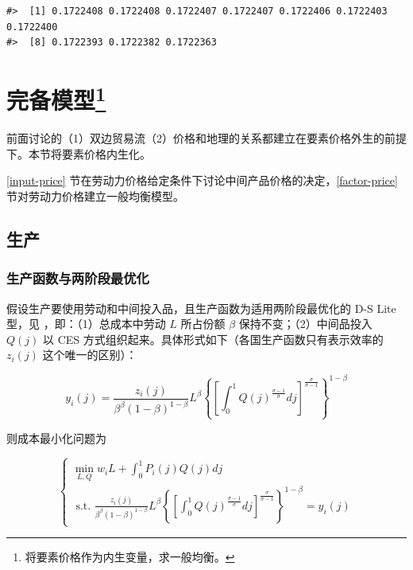 \documentclass[
]{article}
\begin{document}
\begin{verbatim}
#>  [1] 0.1722408 0.1722408 0.1722407 0.1722407 0.1722406 0.1722403 0.1722400
#>  [8] 0.1722393 0.1722382 0.1722363
\end{verbatim}

\hypertarget{ux5b8cux5907ux6a21ux578b14}{%
\section[完备模型]{\texorpdfstring{完备模型\footnote{将要素价格作为内生变量，求一般均衡。}}{完备模型}}\label{ux5b8cux5907ux6a21ux578b14}}

前面讨论的（1）双边贸易流（2）价格和地理的关系都建立在要素价格外生的前提下。本节将要素价格内生化。

\ref{input-price}
节在劳动力价格给定条件下讨论中间产品价格的决定，\ref{factor-price}
节对劳动力价格建立一般均衡模型。

\hypertarget{ux751fux4ea7}{%
\subsection{生产}\label{ux751fux4ea7}}

\hypertarget{ux751fux4ea7ux51fdux6570ux4e0eux4e24ux9636ux6bb5ux6700ux4f18ux5316}{%
\subsubsection{生产函数与两阶段最优化}\label{ux751fux4ea7ux51fdux6570ux4e0eux4e24ux9636ux6bb5ux6700ux4f18ux5316}}

假设生产要使用劳动和中间投入品，且生产函数为适用两阶段最优化的 D-S Lite 型，见
\citet{DS1977} ，即：（1）总成本中劳动 \(L\) 所占份额 \(\beta\) 保持不变；（2）中间品投入
\(Q(j)\) 以 CES 方式组织起来。具体形式如下（各国生产函数只有表示效率的 \(z_i(j)\)
这个唯一的区别）：

\[
y_{i}(j)=\frac{z_{i}(j)}{\beta^{\beta}(1-\beta)^{1-\beta}} L^{\beta}\left\{\left[\int_{0}^{1} Q(j)^{\frac{\sigma-1}{\sigma}} d j\right]^{\frac{\sigma}{\sigma-1}}\right\}^{1-\beta}
\]

则成本最小化问题为

\[
\left\{\begin{array}{c}
{\min_{L, Q} w_{i}L + \int_{0}^{1} P_{i}(j)Q(j) d j} \\ {\text { s.t. }\frac{z_{i}(j)}{\beta^{\beta}(1-\beta)^{1-\beta}} L^{\beta}\left\{\left[\int_{0}^{1} Q(j)^{\frac{\sigma-1}{\sigma}} d j\right]^{\frac{\sigma}{\sigma-1}}\right\}^{1-\beta}=y_{i}(j)}
\end{array}\right.
\]
\end{document}
